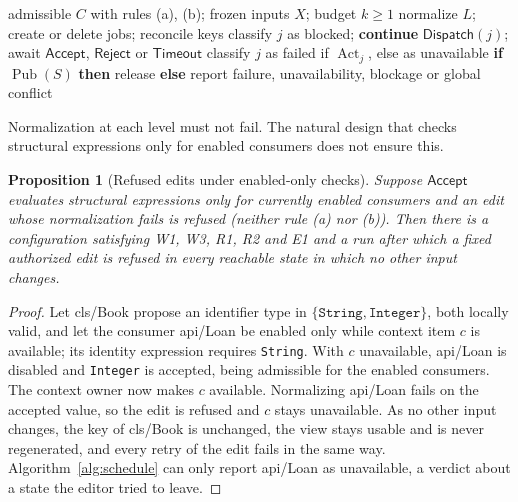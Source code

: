 \documentclass[pdflatex,sn-mathphys-num]{sn-jnl}
\theoremstyle{thmstyleone}%
\newtheorem{proposition}[theorem]{Proposition}%
\theoremstyle{thmstyletwo}%
\theoremstyle{thmstylethree}%
\newcommand{\Act}{\operatorname{Act}}
\newcommand{\Pub}{\operatorname{Pub}}
\newcommand{\Acc}{\mathsf{Accept}}
\newcommand{\Disp}{\mathsf{Dispatch}}
\newcommand{\vw}[1]{\textsf{#1}}
\begin{document}
\begin{algorithm}[!ht]
\caption{Topological repair of a stable revision}\label{alg:schedule}
\footnotesize
\begin{algorithmic}[1]
\Require admissible $C$ with rules (a), (b); frozen inputs $X$; budget $k\ge1$
  \State normalize $L$; create or delete jobs; reconcile keys 
     classify $j$ as blocked; \textbf{continue} \EndIf
    \While{$\Act_j\land\neg U_j\land n_j<k$} $\Disp(j)$; await $\Acc$, $\mathsf{Reject}$ or $\mathsf{Timeout}$ \EndWhile
     classify $j$ as failed if $\Act_j$, else as unavailable \EndIf
  \EndFor
\EndFor
\State \textbf{if} $\Pub(S)$ \textbf{then} release \textbf{else} report failure, unavailability, blockage or global conflict
\end{algorithmic}
\end{algorithm}

Normalization at each level must not fail. The natural design that checks structural expressions only for enabled consumers does not ensure this.

\begin{proposition}[Refused edits under enabled-only checks]\label{prop:hazard}
Suppose $\Acc$ evaluates structural expressions only for currently enabled consumers and an edit whose normalization fails is refused (neither rule (a) nor (b)). Then there is a configuration satisfying W1, W3, R1, R2 and E1 and a run after which a fixed authorized edit is refused in every reachable state in which no other input changes.
\end{proposition}
\begin{proof}
Let \vw{cls/Book} propose an identifier type in $\{\texttt{String},\texttt{Integer}\}$, both locally valid, and let the consumer \vw{api/Loan} be enabled only while context item $c$ is available; its identity expression requires \texttt{String}. With $c$ unavailable, \vw{api/Loan} is disabled and \texttt{Integer} is accepted, being admissible for the enabled consumers. The context owner now makes $c$ available. Normalizing \vw{api/Loan} fails on the accepted value, so the edit is refused and $c$ stays unavailable. As no other input changes, the key of \vw{cls/Book} is unchanged, the view stays usable and is never regenerated, and every retry of the edit fails in the same way. Algorithm~\ref{alg:schedule} can only report \vw{api/Loan} as unavailable, a verdict about a state the editor tried to leave.
\end{proof}
\end{document}
